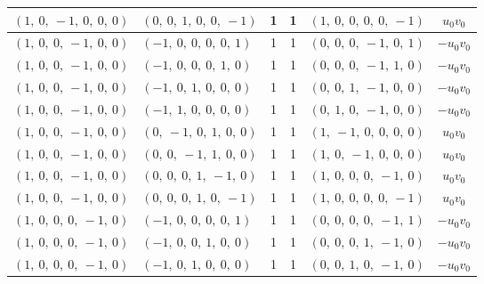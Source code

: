 \documentclass[11pt]{article}
\theoremstyle{definition}
\begin{document}
\begin{longtable}{|l|l|c|c|l|c|}
    \hline
    $\left( 1, \  0, \  -1, \  0, \  0, \  0\right)$ & $\left( 0, \  0, \  1, \  0, \  0, \  -1\right)$ & 1 & 1 & $\left( 1, \  0, \  0, \  0, \  0, \  -1\right)$ & $u_{0} v_{0}$ \\
    \hline
    $\left( 1, \  0, \  0, \  -1, \  0, \  0\right)$ & $\left( -1, \  0, \  0, \  0, \  0, \  1\right)$ & 1 & 1 & $\left( 0, \  0, \  0, \  -1, \  0, \  1\right)$ & $- u_{0} v_{0}$ \\
    \hline
    $\left( 1, \  0, \  0, \  -1, \  0, \  0\right)$ & $\left( -1, \  0, \  0, \  0, \  1, \  0\right)$ & 1 & 1 & $\left( 0, \  0, \  0, \  -1, \  1, \  0\right)$ & $- u_{0} v_{0}$ \\
    \hline
    $\left( 1, \  0, \  0, \  -1, \  0, \  0\right)$ & $\left( -1, \  0, \  1, \  0, \  0, \  0\right)$ & 1 & 1 & $\left( 0, \  0, \  1, \  -1, \  0, \  0\right)$ & $- u_{0} v_{0}$ \\
    \hline
    $\left( 1, \  0, \  0, \  -1, \  0, \  0\right)$ & $\left( -1, \  1, \  0, \  0, \  0, \  0\right)$ & 1 & 1 & $\left( 0, \  1, \  0, \  -1, \  0, \  0\right)$ & $- u_{0} v_{0}$ \\
    \hline
    $\left( 1, \  0, \  0, \  -1, \  0, \  0\right)$ & $\left( 0, \  -1, \  0, \  1, \  0, \  0\right)$ & 1 & 1 & $\left( 1, \  -1, \  0, \  0, \  0, \  0\right)$ & $u_{0} v_{0}$ \\
    \hline
    $\left( 1, \  0, \  0, \  -1, \  0, \  0\right)$ & $\left( 0, \  0, \  -1, \  1, \  0, \  0\right)$ & 1 & 1 & $\left( 1, \  0, \  -1, \  0, \  0, \  0\right)$ & $u_{0} v_{0}$ \\
    \hline
    $\left( 1, \  0, \  0, \  -1, \  0, \  0\right)$ & $\left( 0, \  0, \  0, \  1, \  -1, \  0\right)$ & 1 & 1 & $\left( 1, \  0, \  0, \  0, \  -1, \  0\right)$ & $u_{0} v_{0}$ \\
    \hline
    $\left( 1, \  0, \  0, \  -1, \  0, \  0\right)$ & $\left( 0, \  0, \  0, \  1, \  0, \  -1\right)$ & 1 & 1 & $\left( 1, \  0, \  0, \  0, \  0, \  -1\right)$ & $u_{0} v_{0}$ \\
    \hline
    $\left( 1, \  0, \  0, \  0, \  -1, \  0\right)$ & $\left( -1, \  0, \  0, \  0, \  0, \  1\right)$ & 1 & 1 & $\left( 0, \  0, \  0, \  0, \  -1, \  1\right)$ & $- u_{0} v_{0}$ \\
    \hline
    $\left( 1, \  0, \  0, \  0, \  -1, \  0\right)$ & $\left( -1, \  0, \  0, \  1, \  0, \  0\right)$ & 1 & 1 & $\left( 0, \  0, \  0, \  1, \  -1, \  0\right)$ & $- u_{0} v_{0}$ \\
    \hline
    $\left( 1, \  0, \  0, \  0, \  -1, \  0\right)$ & $\left( -1, \  0, \  1, \  0, \  0, \  0\right)$ & 1 & 1 & $\left( 0, \  0, \  1, \  0, \  -1, \  0\right)$ & $- u_{0} v_{0}$ \\

\end{longtable}
\end{document}
